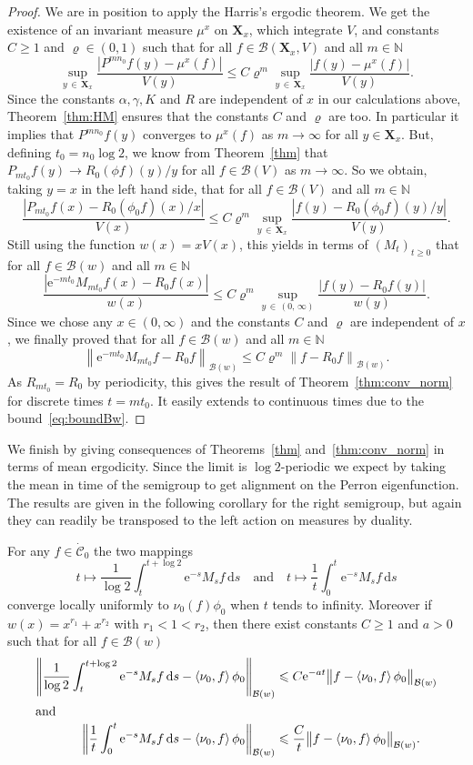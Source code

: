 \documentclass[10pt]{amsart}
\theoremstyle{definition}\newtheorem{defi}[theo]{Definition}\newtheorem{rema}[theo]{Remark}\newtheorem{exam}[theo]{Example}\newtheorem{exem}[theo]{Example}\newtheorem{nota}[theo]{Notation}
\renewcommand{\leq}{\leqslant}
\renewcommand{\geq}{\geqslant}
\newcommand{\Cdot}{{\dot{\mathcal{C}}}}
\newcommand{\B}{\mathcal{B}}
\newcommand{\N}{\mathbb{N}}
\newcommand{\1}{\mathds{1}}
\newcommand{\X}{\mathbf{X}}
\newcommand{\e}{\mathrm{e}}
\renewcommand{\d}{\mathrm{d}}
\begin{document}
\begin{proof}
We are in position to apply the Harris's ergodic theorem. We get the existence of an invariant measure $\mu^x$ on $\X_x$, which integrate $V$, and constants $C\geq1$ and $\varrho\in(0,1)$ such that for all $f\in\B(\X_x,V)$ and all $m\in\N$
\[
\sup_{y\,\in\,\X_x}\frac{\left|P^{mn_0}f(y)-\mu^x(f)\right|}{V(y)}\leq C\varrho^m\sup_{y\,\in\, \X_x}\frac{\left|f(y)-\mu^x(f)\right|}{V(y)}.
\]
Since the constants $\alpha,\gamma,K$ and $R$ are independent of $x$ in our calculations above, Theorem~\ref{thm:HM} ensures that the constants $C$ and $\varrho$ are too. In particular it implies that $P^{mn_0}f(y)$ converges to $\mu^x(f)$ as $m\to\infty$ for all $y\in\X_x$. But, defining $t_0=n_0\log2$, we know from Theorem~\ref{thm} that $P_{mt_0}f(y)\to R_0(\phi f)(y)/y$ for all $f\in\B(V)$ as $m\to\infty$. So we obtain, taking $y=x$ in the left hand side, that for all $f\in\B(V)$ and all $m\in\N$
\[
\frac{\left|P_{m t_0}f(x)-R_0(\phi_0 f)(x)/x\right|}{V(x)}\leq C\varrho^m\sup_{y\,\in\,\X_x}\frac{\left|f(y)-R_0(\phi_0 f)(y)/y\right|}{V(y)}.
\]
Still using the function $w(x)=xV(x)$, this yields in terms of $(M_t)_{t\geq0}$ that for all $f\in\B(w)$ and all $m\in\N$
\[
\frac{\left|\e^{-mt_0}M_{m t_0}f(x)-R_0f(x)\right|}{w(x)}\leq C\varrho^m\sup_{y\,\in\,(0,\,\infty)}\frac{\left|f(y)-R_0f(y)\right|}{w(y)}.
\]
Since we chose any $x\in(0,\infty)$ and the constants $C$ and $\varrho$ are independent of $x$, we finally proved that for all $f\in\B(w)$ and all $m\in\N$
\[
\left\|\e^{-mt_0}M_{m t_0}f-R_0f\right\|_{\B(w)}\leq C\varrho^m\left\|f-R_0f\right\|_{\B(w)}.
\]
As $R_{mt_0}=R_0$ by periodicity, this gives the result of Theorem~\ref{thm:conv_norm} for discrete times $t=mt_0$. It easily extends to continuous times due to the bound~\eqref{eq:boundBw}.
\end{proof}


We finish by giving consequences of Theorems~\ref{thm} and~\ref{thm:conv_norm} in terms of mean ergodicity. Since the limit is $\log2$-periodic we expect by taking the mean in time of the semigroup to get alignment on the Perron eigenfunction. The results are given in the following corollary for the right semigroup, but again they can readily be transposed to the left action on measures by duality.


\begin{coro}\label{coro}
For any $f\in \Cdot_0$ the two mappings
\[
t\mapsto\frac{1}{\log 2}\int_t^{t+\log 2} \e^{-s}M_sf\, \d s \quad \text{and} \quad t\mapsto\frac{1}{t}\int_0^t \e^{-s}M_sf \,\d s
\]
converge locally uniformly to $\nu_0 (f)\phi_0$ when $t$ tends to infinity. Moreover if $w(x)=x^{r_1}+x^{r_2}$ with $r_1<1<r_2$, then there exist constants $C\geq1$ and $a>0$ such that for all $f\in\B(w)$
\begin{align*}
\left\|\frac{1}{\log 2}\int_t^{t+\log 2} \e^{-s}M_sf\, \d s-\left\langle\nu_0,f\right\rangle\phi_0\right\|_{\B(w)} &\leq C\e^{-at}\big\|f-\left\langle\nu_0,f\right\rangle\phi_0\big\|_{\B(w)}
\\
\intertext{and}
\left\|\frac{1}{t}\int_0^t \e^{-s}M_sf \,\d s-\left\langle\nu_0,f\right\rangle\phi_0\right\|_{\B(w)} &\leq \frac{C}{t}\big\|f-\left\langle\nu_0,f\right\rangle\phi_0\big\|_{\B(w)}.
\end{align*}
\end{coro}
\end{document}

